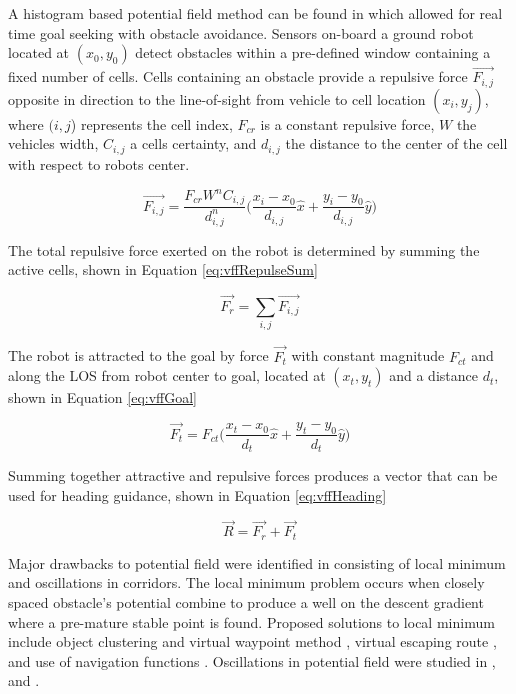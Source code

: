 \documentclass[conf]{new-aiaa}
\begin{document}
A histogram based potential field method can be found in \cite{borenstein_real-time_1990,borenstein_vector_1991,koren_potential_1991} which allowed for real time goal seeking with obstacle avoidance. Sensors on-board a ground robot located at $(x_0,y_0)$ detect obstacles within a pre-defined window containing a fixed number of cells. Cells containing an obstacle provide a repulsive force $\overrightarrow{F_{i,j}}$ opposite in direction to the line-of-sight from vehicle to cell location $(x_i,y_j)$, where $(i,j$) represents the cell index, $F_{cr}$ is a constant repulsive force, $W$ the vehicles width, $C_{i,j}$ a cells certainty, and $d_{i,j}$ the distance to the center of the cell with respect to robots center.

\begin{equation}\label{eq:vffRepulse}
\overrightarrow{F_{i,j}} = \frac{F_{cr}W^nC_{i,j}}{d^n_{i,j}} \bigg( \frac{x_i-x_0}{d_{i,j}}\hat{x} + \frac{y_i-y_0}{d_{i,j}}\hat{y}\bigg)
\end{equation}

The total repulsive force exerted on the robot is determined by summing the active cells, shown in Equation \ref{eq:vffRepulseSum}


\begin{equation}\label{eq:vffRepulseSum}
\overrightarrow{F_r} = \sum_{i,j}\overrightarrow{F_{i,j}}
\end{equation}

The robot is attracted to the goal by force $\overrightarrow{F_t}$ with constant magnitude $F_{ct}$ and along the LOS from robot center to goal, located at $(x_t,y_t)$ and a distance $d_t$, shown in Equation \ref{eq:vffGoal}

\begin{equation}\label{eq:vffGoal}
\overrightarrow{F_t} = F_{ct} \bigg( \frac{x_t-x_0}{d_{t}}\hat{x} + \frac{y_t-y_0}{d_{t}}\hat{y}\bigg)
\end{equation}

Summing together attractive and repulsive forces produces a vector that can be used for heading guidance, shown in Equation \ref{eq:vffHeading}

\begin{equation}\label{eq:vffHeading}
\overrightarrow{R} = \overrightarrow{F_r} + \overrightarrow{F_t}
\end{equation}

 Major drawbacks to potential field were identified in \cite{koren_potential_1991} consisting of local minimum and oscillations in corridors. The local minimum problem occurs when closely spaced obstacle's potential combine to produce a well on the descent gradient where a pre-mature stable point is found. Proposed solutions to local minimum include object clustering and virtual waypoint method \cite{liu_virtual-waypoint_2016}, virtual escaping route \cite{kim_escaping_2009}, and use of navigation functions \cite{goerzen_survey_2010}. Oscillations in potential field were studied in \cite{lei_tang_novel_2010}, and \cite{li_efficient_2012}.
\end{document}
